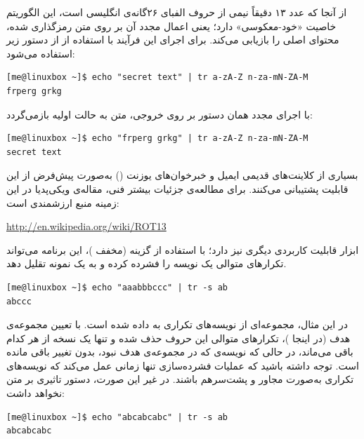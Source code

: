 از آنجا که عدد ۱۳ دقیقاً نیمی از حروف الفبای ۲۶گانه‌ی انگلیسی است، این الگوریتم خاصیت «خود-معکوسی» دارد؛ یعنی اعمال مجدد آن بر روی متن رمزگذاری شده، محتوای اصلی را بازیابی می‌کند. برای اجرای این فرآیند با استفاده از  از دستور زیر استفاده می‌شود:

\begin{latin}
\begin{lstlisting}
[me@linuxbox ~]$ echo "secret text" | tr a-zA-Z n-za-mN-ZA-M
frperg grkg
\end{lstlisting}
\end{latin}

با اجرای مجدد همان دستور بر روی خروجی، متن به حالت اولیه بازمی‌گردد:

\begin{latin}
\begin{lstlisting}
[me@linuxbox ~]$ echo "frperg grkg" | tr a-zA-Z n-za-mN-ZA-M
secret text
\end{lstlisting}
\end{latin}

بسیاری از کلاینت‌های قدیمی ایمیل و خبرخوان‌های یوزنت () به‌صورت پیش‌فرض از این قابلیت پشتیبانی می‌کنند. برای مطالعه‌ی جزئیات بیشتر فنی، مقاله‌ی ویکی‌پدیا در این زمینه منبع ارزشمندی است:

\begin{latin}
\url{http://en.wikipedia.org/wiki/ROT13}
\end{latin}

ابزار  قابلیت کاربردی دیگری نیز دارد؛ با استفاده از گزینه  (مخفف )، این برنامه می‌تواند تکرارهای متوالی یک نویسه را فشرده کرده و به یک نمونه تقلیل دهد.

\begin{latin}
\begin{lstlisting}
[me@linuxbox ~]$ echo "aaabbbccc" | tr -s ab
abccc
\end{lstlisting}
\end{latin}

در این مثال، مجموعه‌ای از نویسه‌های تکراری به  داده شده است. با تعیین مجموعه‌ی هدف (در اینجا )، تکرارهای متوالی این حروف حذف شده و تنها یک نسخه از هر کدام باقی می‌ماند، در حالی که نویسه‌ی  که در مجموعه‌ی هدف نبود، بدون تغییر باقی مانده است. توجه داشته باشید که عملیات فشرده‌سازی تنها زمانی عمل می‌کند که نویسه‌های تکراری به‌صورت مجاور و پشت‌سرهم باشند. در غیر این صورت، دستور تاثیری بر متن نخواهد داشت:

\begin{latin}
\begin{lstlisting}
[me@linuxbox ~]$ echo "abcabcabc" | tr -s ab
abcabcabc
\end{lstlisting}
\end{latin}

